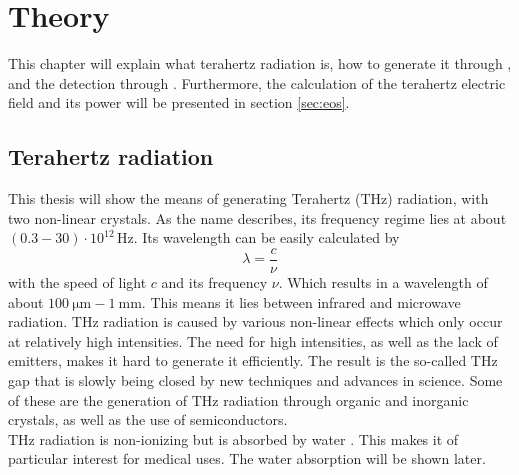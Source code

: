 \chapter{Theory}
This chapter will explain what terahertz radiation is, how to generate it through , and the detection through .
Furthermore, the calculation of the terahertz electric field and its power will be presented in section \ref{sec:eos}.
\section{Terahertz radiation}
This thesis will show the means of generating Terahertz ($\si{\tera\hertz}$) radiation, with two non-linear crystals.
As the name describes, its frequency regime lies at about $(0.3-30)\cdot10^{12}\,\si{\hertz}$.
Its wavelength can be easily calculated by
\begin{equation}
    \lambda = \frac{c}{\nu}
\end{equation}
with the speed of light $c$ and its frequency $\nu$.
Which results in a wavelength of about $\SI{100}{\micro\meter}-\SI{1}{\milli\meter}$.
This means it lies between infrared and microwave radiation.
$\si{\tera\hertz}$ radiation is caused by various non-linear effects which only occur at relatively high intensities.
The need for high intensities, as well as the lack of emitters, makes it hard to generate it efficiently.
The result is the so-called $\si{\tera\hertz}$ gap that is slowly being closed by new techniques and advances in science.
Some of these are the generation of $\si{\tera\hertz}$ radiation through organic and inorganic crystals, as well as the use of semiconductors.
\\
$\si{\tera\hertz}$ radiation is non-ionizing but is absorbed by water \cite{water_absorption}.
This makes it of particular interest for medical uses.
The water absorption will be shown later. 


